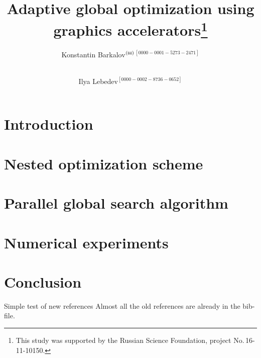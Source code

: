 \documentclass{svproc}
\def\orcidID#1{\unskip$^{[#1]}$}
\def\letter{$^{\textrm{(\Letter)}}$}
\begin{document}
\mainmatter              %
%
\title{Adaptive global optimization using graphics accelerators\thanks{This study was supported by the Russian Science Foundation, project No.\,16-11-10150.}
}
%
%
\author{Konstantin Barkalov\letter\orcidID{0000-0001-5273-2471} \and \\  Ilya Lebedev\orcidID{0000-0002-8736-0652}}
%
%
%
	
\maketitle              %

\begin{abstract}




\end{abstract}

\section{Introduction}




\section{Nested optimization scheme}


\section{Parallel global search algorithm}


\section{Numerical experiments}


\section{Conclusion}

Simple test of new references
\cite{Hwu2011,Ferreiro2013,Garcia2014,Langdon2011,He2008,Evtushenko2009,Paulavicius2011,Kindratenko2014}
Almost all the old references are already in the bib-file.

%
%

{}
\end{document}

